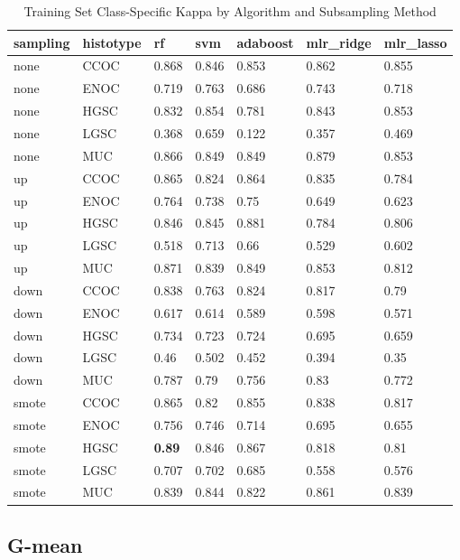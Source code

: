 \documentclass[
]{report}
\begin{document}
\begin{table}

\caption{\label{tab:train-kappa-class-table}Training Set Class-Specific Kappa by Algorithm and Subsampling Method}
\centering
\begin{tabular}[t]{l|l|l|l|l|l|l}
\hline
sampling & histotype & rf & svm & adaboost & mlr\_ridge & mlr\_lasso\\
\hline
none & CCOC & 0.868 & 0.846 & 0.853 & 0.862 & 0.855\\
\hline
none & ENOC & 0.719 & 0.763 & 0.686 & 0.743 & 0.718\\
\hline
none & HGSC & 0.832 & 0.854 & 0.781 & 0.843 & 0.853\\
\hline
none & LGSC & 0.368 & 0.659 & 0.122 & 0.357 & 0.469\\
\hline
none & MUC & 0.866 & 0.849 & 0.849 & 0.879 & 0.853\\
\hline
up & CCOC & 0.865 & 0.824 & 0.864 & 0.835 & 0.784\\
\hline
up & ENOC & 0.764 & 0.738 & 0.75 & 0.649 & 0.623\\
\hline
up & HGSC & 0.846 & 0.845 & 0.881 & 0.784 & 0.806\\
\hline
up & LGSC & 0.518 & 0.713 & 0.66 & 0.529 & 0.602\\
\hline
up & MUC & 0.871 & 0.839 & 0.849 & 0.853 & 0.812\\
\hline
down & CCOC & 0.838 & 0.763 & 0.824 & 0.817 & 0.79\\
\hline
down & ENOC & 0.617 & 0.614 & 0.589 & 0.598 & 0.571\\
\hline
down & HGSC & 0.734 & 0.723 & 0.724 & 0.695 & 0.659\\
\hline
down & LGSC & 0.46 & 0.502 & 0.452 & 0.394 & 0.35\\
\hline
down & MUC & 0.787 & 0.79 & 0.756 & 0.83 & 0.772\\
\hline
smote & CCOC & 0.865 & 0.82 & 0.855 & 0.838 & 0.817\\
\hline
smote & ENOC & 0.756 & 0.746 & 0.714 & 0.695 & 0.655\\
\hline
smote & HGSC & \textbf{0.89} & 0.846 & 0.867 & 0.818 & 0.81\\
\hline
smote & LGSC & 0.707 & 0.702 & 0.685 & 0.558 & 0.576\\
\hline
smote & MUC & 0.839 & 0.844 & 0.822 & 0.861 & 0.839\\
\hline
\end{tabular}
\end{table}

\hypertarget{g-mean}{%
\subsection{G-mean}\label{g-mean}}
\end{document}
